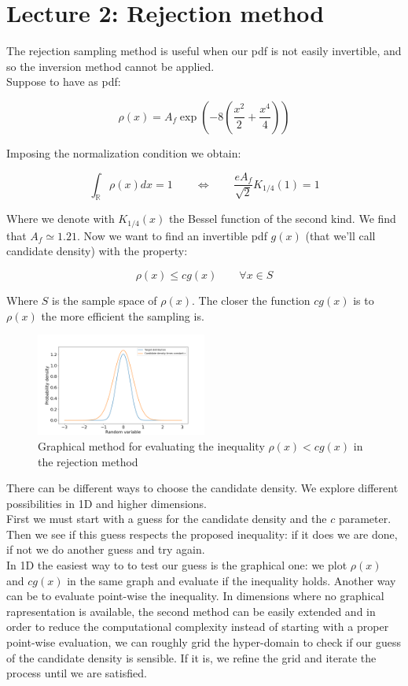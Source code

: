 \chapter*{Lecture 2: Rejection method}

The rejection sampling method is useful when our pdf is not easily invertible, and so the inversion method cannot be applied. \\
Suppose to have as pdf:

$$ \rho(x) = A_f \exp\left( -8 \left( \frac{x^2}{2}+\frac{x^4}{4} \right) \right) $$

Imposing the normalization condition we obtain:

$$ \int_{\mathbb{R}} \rho(x) dx = 1 \qquad \iff \qquad   \frac{eA_f}{\sqrt{2}}K_{1/4}(1) = 1$$

Where we denote with $K_{1/4}(x)$ the Bessel function of the second kind. 
We find that $A_f \simeq 1.21$.
Now we want to find an invertible pdf $g(x)$ (that we'll call candidate density) with the property:

$$ \rho(x) \leq c g(x) \qquad \forall x \in S $$

Where $S$ is the sample space of $\rho(x)$.
The closer the function $cg(x)$ is to $\rho(x)$ the more efficient the sampling is. \\

\begin{figure}
    \vspace{-25pt}
    \centering
    \includegraphics[width=0.5\textwidth]{FIG/exercise_2_images/rejection_sampling_inequality_check.png}
    \caption{Graphical method for evaluating the inequality $\rho(x)< cg(x)$ in the rejection method}
    \label{chapter2_rej_ineq}
\end{figure}


There can be different ways to choose the candidate density. We explore different possibilities in 1D and higher dimensions. \\
First we must start with a guess for the candidate density and the $c$ parameter. Then we see if this guess respects the proposed inequality: if it does we are done, if not we do another guess and try again. \\ 
In 1D the easiest way to to test our guess is the graphical one: we plot $\rho(x)$ and $cg(x)$ in the same graph and evaluate if the inequality holds. Another way can be to evaluate point-wise the inequality.
In dimensions where no graphical rapresentation is available, the second method can be easily extended and in order to reduce the computational complexity instead of starting with a proper point-wise evaluation, we can roughly grid the hyper-domain to check if our guess of the candidate density is sensible. If it is, we refine the grid and iterate the process until we are satisfied.

